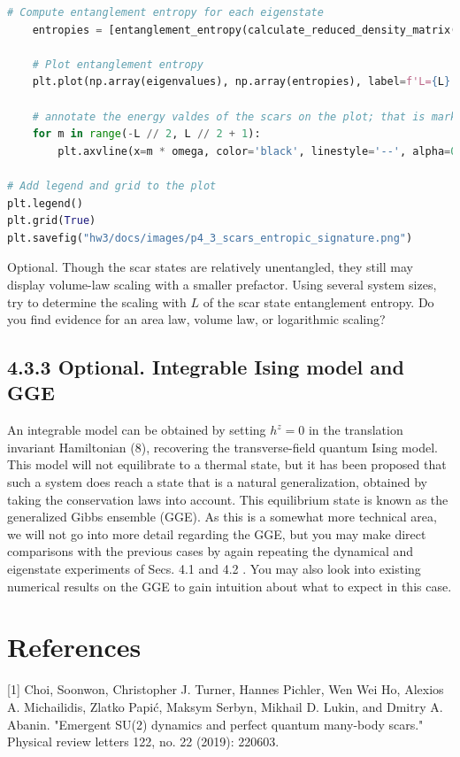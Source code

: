 \documentclass[12pt]{article}
\begin{document}
\begin{lstlisting}[language=Python]
    # Compute entanglement entropy for each eigenstate
    entropies = [entanglement_entropy(calculate_reduced_density_matrix(vec, L, L // 2)) for vec in eigenvectors]

    # Plot entanglement entropy
    plt.plot(np.array(eigenvalues), np.array(entropies), label=f'L={L}')

    # annotate the energy valdes of the scars on the plot; that is mark evidently far less entangled than the typical eigenstate. For this simple model, the number and exact energies of the scar states are known, indexed by $m=\{-L / 2,-L / 2+1, \ldots, L / 2-1, L / 2\}$ (that is, the $S^{z}$ spin states of an overall spin $s=L / 2$ system), with harmonically spaced energies $E_{m}=\Omega m$. Indicate these energy values on your plot.
    for m in range(-L // 2, L // 2 + 1):
        plt.axvline(x=m * omega, color='black', linestyle='--', alpha=0.5)

# Add legend and grid to the plot
plt.legend()
plt.grid(True)
plt.savefig("hw3/docs/images/p4_3_scars_entropic_signature.png")

\end{lstlisting}


Optional. Though the scar states are relatively unentangled, they still may display volume-law scaling with a smaller prefactor. Using several system sizes, try to determine the scaling with $L$ of the scar state entanglement entropy. Do you find evidence for an area law, volume law, or logarithmic scaling?

\subsection*{4.3.3 Optional. Integrable Ising model and GGE}
An integrable model can be obtained by setting $h^{z}=0$ in the translation invariant Hamiltonian (8), recovering the transverse-field quantum Ising model. This model will not equilibrate to a thermal state, but it has been proposed that such a system does reach a state that is a natural generalization, obtained by taking the conservation laws into account. This equilibrium state is known as the generalized Gibbs ensemble (GGE). As this is a somewhat more technical area, we will not go into more detail regarding the GGE, but you may make direct comparisons with the previous cases by again repeating the dynamical and eigenstate experiments of Secs. 4.1 and 4.2 . You may also look into existing numerical results on the GGE to gain intuition about what to expect in this case.

\section*{References}
[1] Choi, Soonwon, Christopher J. Turner, Hannes Pichler, Wen Wei Ho, Alexios A. Michailidis, Zlatko Papić, Maksym Serbyn, Mikhail D. Lukin, and Dmitry A. Abanin. "Emergent SU(2) dynamics and perfect quantum many-body scars." Physical review letters 122, no. 22 (2019): 220603.
\end{document}
